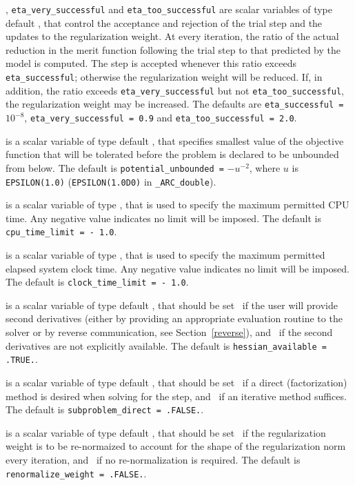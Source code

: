 \documentclass{galahad}
\newcommand{\packagename}{ARC}
\newcommand{\fullpackagename}{\libraryname\_\packagename}
\begin{document}
\begin{description}
, {\tt eta\_very\_successful}
and {\tt eta\_too\_successful}
are scalar variables of type default
\realdp, that control the acceptance and rejection of the trial step
and the updates to the regularization weight.
At every iteration, the ratio of the actual reduction in the merit function
following the trial step to that predicted by the model is computed.
The step is accepted whenever this ratio exceeds {\tt eta\_successful};
otherwise the regularization weight will be reduced.
If, in addition, the ratio exceeds {\tt eta\_very\_successful} but not
{\tt eta\_too\_successful}, the regularization weight may be increased.
The defaults are
{\tt eta\_successful =} $10^{-8}$,
{\tt eta\_very\_successful = 0.9} and
{\tt eta\_too\_successful = 2.0}.

  is a scalar variable of type default
\realdp, that specifies smallest
value of the objective function that will be tolerated before the problem
is declared to be unbounded from below.
The default is {\tt potential\_u\-nbounded =} $-u^{-2}$,
where $u$ is {\tt EPSILON(1.0)} ({\tt EPSILON(1.0D0)} in
{\tt \fullpackagename\_double}).

 is a scalar variable of type \realdp,
that is used to specify the maximum permitted CPU time. Any negative
value indicates no limit will be imposed. The default is
{\tt cpu\_time\_limit = - 1.0}.

 is a scalar variable of type \realdp,
that is used to specify the maximum permitted elapsed system clock time.
Any negative value indicates no limit will be imposed. The default is
{\tt clock\_time\_limit = - 1.0}.

is a scalar variable of type default \logical,
that should be set \true\ if the user will provide second derivatives
(either by providing an appropriate evaluation routine to the solver
or by reverse communication, see Section~\ref{reverse}), and
\false\ if the second derivatives are not explicitly available.
The default is {\tt hessian\_available = .TRUE.}.

is a scalar variable of type default \logical,
that should be set \true\ if a direct (factorization) method is
desired when solving for the step, and \false\ if an iterative
method suffices.
The default is {\tt subproblem\_direct = .FALSE.}.

is a scalar variable of type default \logical,
that should be set \true\ if the regularization weight is to be
re-normaized to account for the shape of the regularization norm
every iteration, and \false\ if no re-normalization is required.
The default is {\tt  renormalize\_weight = .FALSE.}.


\end{description}
\end{document}

